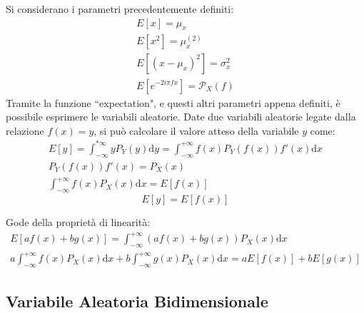 \documentclass{article}
\newcommand{\df}{\mathrm{d}}
\numberwithin{equation}{subsection}
\begin{document}
Si considerano i parametri precedentemente definiti:
\begin{gather*}
    E[x]=\mu_x\\
    E[x^2]=\mu_x^{(2)}\\
    E[(x-\mu_x)^2]=\sigma_x^2\\
    E\left[e^{-2i\pi fx}\right]=\mathscr{P}_X(f)
\end{gather*}
Tramite la funzione ``expectation", e questi altri parametri appena definiti, è possibile esprimere le variabili aleatorie. Date due variabili aleatorie legate dalla 
relazione $f(x)=y$, si può calcolare il valore atteso della variabile $y$ come:
\begin{gather*}
    E[y]=\displaystyle\int_{-\infty}^{*\infty}yP_Y(y)\df y=\int_{-\infty}^{+\infty}f(x)P_Y(f(x))f'(x)\df x\\
    P_Y(f(x))f'(x)=P_X(x)\\
    \int_{-\infty}^{+\infty}f(x)P_X(x)\df x=E[f(x)]
\end{gather*}
\begin{equation}
    E[y]=E[f(x)]
\end{equation}

Gode della proprietà di linearità:
\begin{gather*}
    E[af(x)+bg(x)]=\displaystyle\int_{-\infty}^{+\infty}(af(x)+bg(x))P_X(x)\df x\\
    a\int_{-\infty}^{+\infty}f(x)P_X(x)\df x+b\int_{-\infty}^{+\infty}g(x)P_X(x)\df x=aE[f(x)]+bE[g(x)]
\end{gather*}

\subsection{Variabile Aleatoria Bidimensionale}
\end{document}
